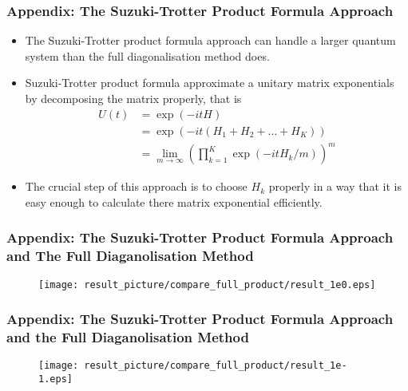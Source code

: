 \documentclass{beamer}
\begin{document}
\begin{frame}
	\frametitle{Appendix: The Suzuki-Trotter Product Formula Approach}
	\begin{itemize}
		\item The Suzuki-Trotter product formula approach can handle a larger quantum system than the full diagonalisation method does.
		\item Suzuki-Trotter product formula approximate a unitary matrix exponentials by decomposing the matrix properly, that is 
		\begin{equation*}
		\label{suzuki-trotter product formula}
		\begin{split}
		U(t) &= \exp(-it H)\\
		&=\exp(-it(H_1+H_2+\dots+H_K))\\
		&=\lim_{m \to \infty}(\prod_{k=1}^{K}\exp(-it H_k/m))^m
		\end{split}
		\end{equation*}
		\item  The crucial step of this approach is to choose $H_k$ properly in a way that it is easy enough to calculate there matrix exponential efficiently.
	\end{itemize}
\end{frame}

\begin{frame}
	\frametitle{Appendix: The Suzuki-Trotter Product Formula Approach and The Full Diaganolisation Method}
	\begin{figure}[h]
		\centering
		\texttt{[image: result\_picture/compare\_full\_product/result\_1e0.eps]}
		
	\end{figure}
\end{frame}



\begin{frame}
	\frametitle{Appendix: The Suzuki-Trotter Product Formula Approach and the Full Diaganolisation Method}
	\begin{figure}[h]
		\centering
		\texttt{[image: result\_picture/compare\_full\_product/result\_1e-1.eps]}
		
	\end{figure}
\end{frame}
\end{document}
